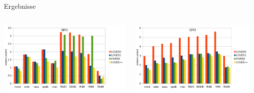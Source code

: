 \documentclass[ngerman,aspectratio=169,10pt]{beamer}
\begin{document}
\begin{frame}{Ergebnisse}
    \begin{columns}
        \begin{column}{0.5\textwidth}
            \includegraphics[width=1.08\textwidth]{graphics/BFO.png}
        \end{column}
        \begin{column}{0.5\textwidth}
            \includegraphics[width=1.03\textwidth]{graphics/DFO.png}
        \end{column}
    \end{columns}
\end{frame}
\end{document}
